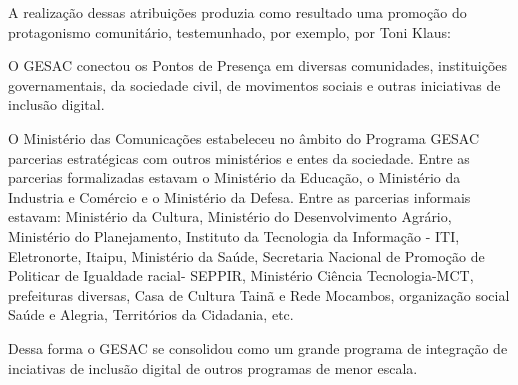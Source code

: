 \documentclass[
12pt,		%
openright,	%
twoside,  %
a4paper,			%
chapter=TITLE,		%
english,			%
french,				%
spanish,			%
brazil				%
]{USPSC-classe/USPSC}
\begin{document}
A realiza\c{c}\~ao dessas atribui\c{c}\~oes produzia como resultado uma promo\c{c}\~ao do protagonismo comunit\'ario, testemunhado, por exemplo, por Toni Klaus:









\noindent\begin{center}\mbox{\centering{}}\end{center}


O GESAC conectou os Pontos de Presen\c{c}a em diversas comunidades, institui\c{c}\~oes governamentais, da sociedade civil, de movimentos sociais e outras iniciativas de inclus\~ao digital.








O Minist\'erio das Comunica\c{c}\~oes estabeleceu no \^ambito do Programa GESAC parcerias estrat\'egicas com outros minist\'erios e entes da sociedade. Entre as parcerias formalizadas estavam o Minist\'erio da Educa\c{c}\~ao, o Minist\'erio da Industria e Com\'ercio e o Minist\'erio da Defesa. Entre as parcerias informais estavam: Minist\'erio da Cultura, Minist\'erio do Desenvolvimento Agr\'ario, Minist\'erio do Planejamento, Instituto da Tecnologia da Informa\c{c}\~ao - ITI, Eletronorte, Itaipu, Minist\'erio da Sa\'ude, Secretaria Nacional de Promo\c{c}\~ao de Politicar de Igualdade racial- SEPPIR, Minist\'erio Ci\^encia Tecnologia-MCT, prefeituras diversas, Casa de Cultura Tain\~a e Rede Mocambos, organiza\c{c}\~ao social \textquotedbl Sa\'ude e Alegria\textquotedbl , Territ\'orios da Cidadania, etc.








Dessa forma o GESAC se consolidou como um grande programa de integra\c{c}\~ao de inciativas de inclus\~ao digital de outros programas de menor escala.
\end{document}
